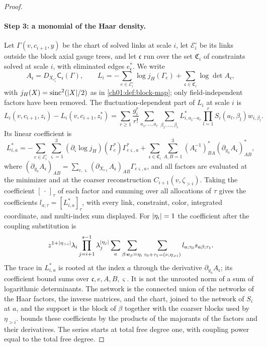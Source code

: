 \begin{proof}
\paragraph{Step 3: a monomial of the Haar density.}
Let $\Gamma(v,c_{i+1},y)$ be the chart of solved links at scale $i$, let $\mathcal E_i^\circ$ be its links outside the block axial gauge trees, and let $\mathfrak c$ run over the set $\mathfrak C_i$ of constraints solved at scale $i$, with eliminated edges $e^*_{\mathfrak c}$. We write
\[
 A_{\mathfrak c}=D_{X_{e^*_{\mathfrak c}}}\mathsf C_{\mathfrak c}(\Gamma),\qquad L_i=-\sum_{e\in\mathcal E_i^\circ}\log j_H(\Gamma_e)+\sum_{\mathfrak c\in\mathfrak C_i}\log\det A_{\mathfrak c},
\]
with $j_H(X)=\operatorname{sinc}^2(\lvert X\rvert/2)$ as in \cref{ch01:def:block-map}; only field-independent factors have been removed. The fluctuation-dependent part of $L_i$ at scale $i$ is
\[
 L_i(v,c_{i+1},z_i)-L_i(v,c_{i+1},z_i^*)=\sum_{r\ge1}\frac{g_i^r}{r!}\sum_{a_1,\ldots,a_r}\sum_{\beta_1,\ldots,\beta_r}L_{i,a_1\cdots a_r}^*\prod_{l=1}^rS_i(a_l,\beta_l)w_{i,\beta_l}.
\]
Its linear coefficient is
\[
 L_{i,a}^*=-\sum_{e\in\mathcal E_i^\circ}\sum_{\varsigma=1}^3(\partial_\varsigma\log j_H)(\Gamma_e^*)\Gamma_{e\varsigma,a}^*+\sum_{\mathfrak c\in\mathfrak C_i}\sum_{A,B=1}^3(A_{\mathfrak c}^{-1})_{BA}^*(\partial_{y_a}A_{\mathfrak c})_{AB}^*,
\]
where $(\partial_{y_a}A_{\mathfrak c})_{AB}=\sum_{e,\varsigma}(\partial_{X_{e\varsigma}}A_{\mathfrak c})_{AB}\Gamma_{e\varsigma,a}$, and all factors are evaluated at the minimizer and at the coarser reconstruction $C_{i+1}(v,\zeta_{>i})$. Taking the coefficient $[\,\cdot\,]_\tau$ of each factor and summing over all allocations of $\tau$ gives the coefficients $l_{a;\tau}=[L_{i,a}^*]_\tau$, with every link, constraint, color, integrated coordinate, and multi-index sum displayed. For $\lvert \eta_i\rvert=1$ the coefficient after the coupling substitution is
\[
 z^{1+\lvert \eta_{>i}\rvert}\lambda_i\prod_{j=i+1}^{s-1}\lambda_j^{\lvert \eta_j\rvert}\sum_a\sum_{\beta:\mathbf e_\beta=\eta_i}\sum_{\tau_0+\tau_1=(\nu,\eta_{>i})}l_{a;\tau_0}s_{a\beta;\tau_1}.
\]
The trace in $L_{i,a}^*$ is rooted at the index $a$ through the derivative $\partial_{y_a}A_{\mathfrak c}$; its coefficient bound sums over $\mathfrak c,e,A,B,\varsigma$. It is not the unrooted norm of a sum of logarithmic determinants. The network is the connected union of the networks of the Haar factors, the inverse matrices, and the chart, joined to the network of $S_i$ at $a$, and the support is the block of $\beta$ together with the coarser blocks used by $\eta_{>i}$.  bounds these coefficients by the products of the majorants of the factors and their derivatives. The series starts at total free degree one, with coupling power equal to the total free degree.


\end{proof}
